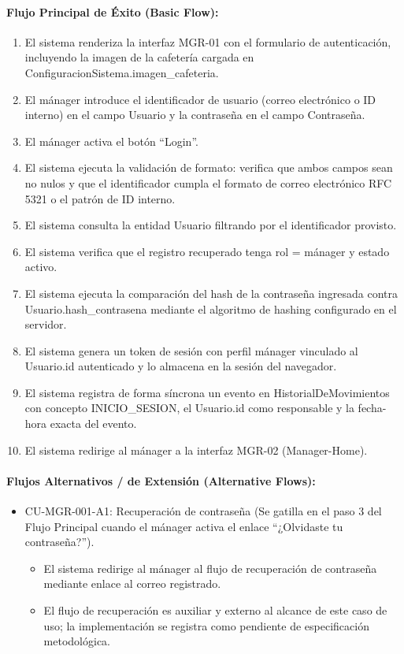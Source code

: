 \paragraph{Flujo Principal de Éxito (Basic Flow):}
\begin{enumerate}
    \item[I.] El sistema renderiza la interfaz MGR-01 con el formulario de autenticación, incluyendo la imagen de la cafetería cargada en ConfiguracionSistema.imagen\_cafeteria.
    \item[II.] El mánager introduce el identificador de usuario (correo electrónico o ID interno) en el campo Usuario y la contraseña en el campo Contraseña.
    \item[III.] El mánager activa el botón ``Login''.
    \item[IV.] El sistema ejecuta la validación de formato: verifica que ambos campos sean no nulos y que el identificador cumpla el formato de correo electrónico RFC 5321 o el patrón de ID interno.
    \item[V.] El sistema consulta la entidad Usuario filtrando por el identificador provisto.
    \item[VI.] El sistema verifica que el registro recuperado tenga rol = mánager y estado activo.
    \item[VII.] El sistema ejecuta la comparación del hash de la contraseña ingresada contra Usuario.hash\_contrasena mediante el algoritmo de hashing configurado en el servidor.
    \item[VIII.] El sistema genera un token de sesión con perfil mánager vinculado al Usuario.id autenticado y lo almacena en la sesión del navegador.
    \item[IX.] El sistema registra de forma síncrona un evento en HistorialDeMovimientos con concepto INICIO\_SESION, el Usuario.id como responsable y la fecha-hora exacta del evento.
    \item[X.] El sistema redirige al mánager a la interfaz MGR-02 (Manager-Home).
\end{enumerate}

\paragraph{Flujos Alternativos / de Extensión (Alternative Flows):}
\begin{itemize}
    \item CU-MGR-001-A1: Recuperación de contraseña (Se gatilla en el paso 3 del Flujo Principal cuando el mánager activa el enlace ``¿Olvidaste tu contraseña?'').
    \begin{itemize}
        \item El sistema redirige al mánager al flujo de recuperación de contraseña mediante enlace al correo registrado.
        \item El flujo de recuperación es auxiliar y externo al alcance de este caso de uso; la implementación se registra como pendiente de especificación metodológica.
    \end{itemize}
\end{itemize}

